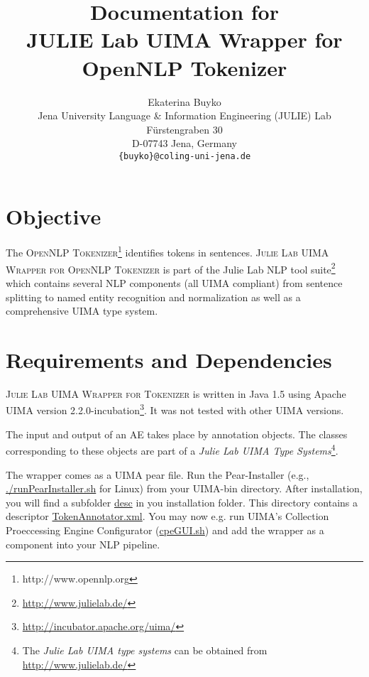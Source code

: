 \documentclass[11pt,a4paper,halfparskip]{scrartcl}
\title{\small{Documentation for}\\\huge JULIE Lab UIMA Wrapper for \\OpenNLP Tokenizer}
\author{\normalsize Ekaterina Buyko\\
  \normalsize  Jena University Language \& Information Engineering (JULIE) Lab\\
  \normalsize F\"urstengraben 30 \\
  \normalsize D-07743 Jena, Germany\\
  {\normalsize \tt \{buyko\}@coling-uni-jena.de} }
\date{}
\begin{document}
\maketitle

\section{Objective}



The \textsc{OpenNLP Tokenizer}\footnote{http://www.opennlp.org} identifies tokens in
sentences. \textsc{Julie Lab UIMA Wrapper for OpenNLP Tokenizer} is part of the Julie Lab
NLP tool suite\footnote{\url{http://www.julielab.de/}} which contains several NLP components (all
UIMA compliant) from sentence splitting to named
entity recognition and normalization as well as a comprehensive UIMA
type system.





\section{Requirements and Dependencies}

\textsc{Julie Lab UIMA Wrapper for Tokenizer} is written in Java 1.5 using Apache
UIMA version 2.2.0-incubation\footnote{\url{http://incubator.apache.org/uima/}}. It
was not tested with other UIMA versions.

The input and output of an AE takes place by annotation objects. The
classes corresponding to these objects are part of a \emph{Julie Lab UIMA
  Type Systems}\footnote{The \emph{Julie Lab UIMA type systems} can be
  obtained from \url{http://www.julielab.de/}}.

The wrapper comes as a UIMA pear file. Run the Pear-Installer (e.g.,
\url{./runPearInstaller.sh} for Linux) from your UIMA-bin directory.
After installation, you will find a subfolder \url{desc} in you
installation folder. This directory contains a descriptor
\url{TokenAnnotator.xml}. You may now e.g. run UIMA's
Collection Proeccessing Engine Configurator (\url{cpeGUI.sh}) and add
the wrapper as a component into your NLP pipeline.
\end{document}
